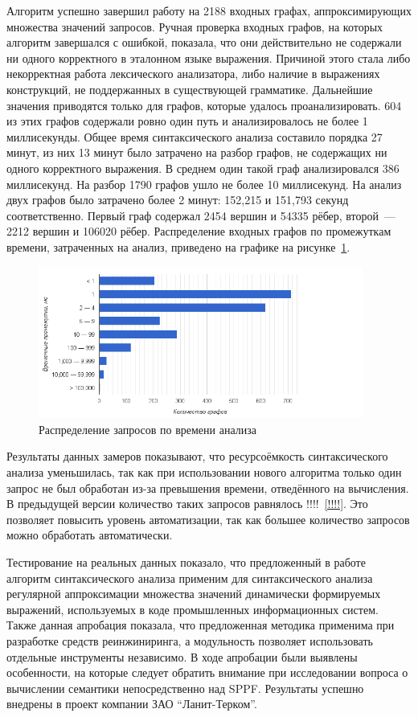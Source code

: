 Алгоритм успешно завершил работу на 2188 входных графах, аппроксимирующих множества значений запросов. Ручная проверка входных графов, на которых алгоритм завершался с ошибкой, показала, что они действительно не содержали ни одного корректного в эталонном языке выражения. Причиной этого стала либо некорректная работа лексического анализатора, либо наличие в выражениях конструкций, не поддержанных в существующей грамматике. Дальнейшие значения приводятся только для графов, которые удалось проанализировать. 604 из этих графов содержали ровно один путь и анализировалось не более 1 миллисекунды. Общее время синтаксического анализа составило порядка 27 минут, из них 13 минут было затрачено на разбор графов, не содержащих ни одного корректного выражения. В среднем один такой граф анализировался 386 миллисекунд. На разбор 1790 графов ушло не более 10 миллисекунд. На анализ двух графов было затрачено более 2 минут: 152,215 и 151,793 секунд соответственно. Первый граф содержал 2454 вершин и 54335 рёбер, второй~--- 2212 вершин и 106020 рёбер. Распределение входных графов по промежуткам времени, затраченных на анализ, приведено на графике на рисунке~\ref{distr}.

\begin{figure}[H]
  \centering
 \includegraphics[width=0.95\textwidth]{pics/distr.png}
 \caption{Распределение запросов по времени анализа}
 \label{distr}
\end{figure}

Результаты данных замеров показывают, что ресурсоёмкость синтаксического анализа уменьшилась, так как при использовании нового алгоритма только один запрос не был обработан из-за превышения времени, отведённого на вычисления. В предыдущей версии количество таких запросов равнялось !!!!~\ref{!!!!}. Это позволяет повысить уровень автоматизации, так как большее количество запросов можно обработать автоматически.

Тестирование на реальных данных показало, что предложенный в работе алгоритм синтаксического анализа применим для синтаксического анализа регулярной аппроксимации множества значений динамически формируемых выражений, используемых в коде промышленных информационных систем. Также данная апробация показала, что предложенная методика применима при разработке средств реинжиниринга, а модульность позволяет использовать отдельные инструменты независимо. В ходе апробации были выявлены особенности, на которые следует обратить внимание при исследовании вопроса о вычислении семантики непосредственно над SPPF. Результаты успешно внедрены в проект компании ЗАО ``Ланит-Терком''.


